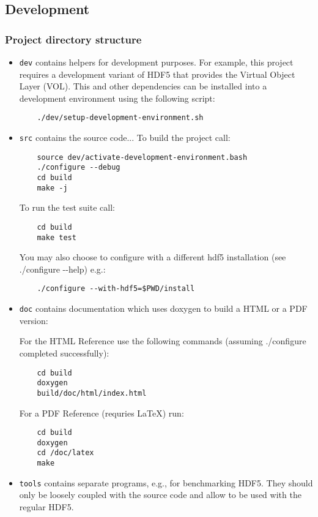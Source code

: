 \subsection{Development}%
\label{development}

\subsubsection{Project directory structure}%
\label{project-directory-structure}

\begin{itemize}
  \item \texttt{dev} contains helpers for development purposes. For example,
    this project requires a development variant of HDF5 that provides the
    Virtual Object Layer (VOL). This and other dependencies can be
    installed into a development environment using the following script:

    \begin{lstlisting}
    ./dev/setup-development-environment.sh
    \end{lstlisting}
  \item \texttt{src} contains the source code... To build the project call:

    \begin{lstlisting}
    source dev/activate-development-environment.bash
    ./configure --debug
    cd build
    make -j
    \end{lstlisting}

    To run the test suite call:

    \begin{lstlisting}
    cd build
    make test
    \end{lstlisting}

    You may also choose to configure with a different hdf5 installation
    (see ./configure -\/-help) e.g.:

    \begin{lstlisting}
    ./configure --with-hdf5=$PWD/install
    \end{lstlisting}
  \item \texttt{doc} contains documentation which uses doxygen to build a HTML
    or a PDF version:

    For the HTML Reference use the following commands (assuming
    ./configure completed successfully):

    \begin{lstlisting}
    cd build
    doxygen
    build/doc/html/index.html
    \end{lstlisting}

    For a PDF Reference (requries LaTeX) run:

    \begin{lstlisting}
    cd build
    doxygen
    cd /doc/latex
    make
    \end{lstlisting}
  \item \texttt{tools} contains separate programs, e.g., for benchmarking
    HDF5. They should only be loosely coupled with the source code and
    allow to be used with the regular HDF5.
\end{itemize}
